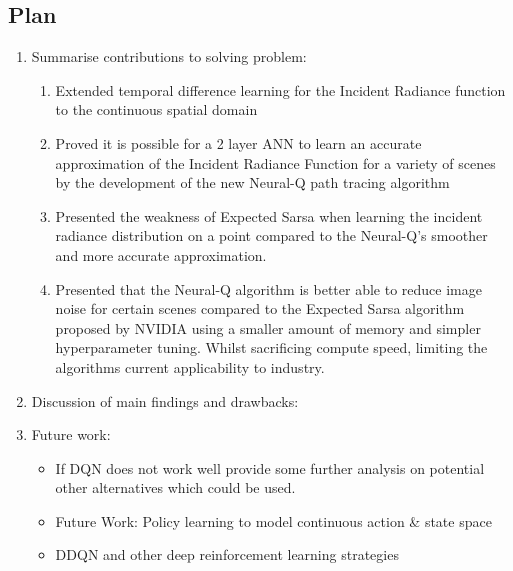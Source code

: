 \documentclass[../dissertation.tex]{subfiles}
\begin{document}
\subsection{Plan}
\begin{enumerate}

\item Summarise contributions to solving problem:
\begin{enumerate}
\item Extended temporal difference learning for the Incident Radiance function to the continuous spatial domain 

\item Proved it is possible for a 2 layer ANN to learn an accurate approximation of the Incident Radiance Function for a variety of scenes by the development of the new Neural-Q path tracing algorithm

\item Presented the weakness of Expected Sarsa when learning the incident radiance distribution on a point compared to the Neural-Q's smoother and more accurate approximation.

\item Presented that the Neural-Q algorithm is better able to reduce image noise for certain scenes compared to the Expected Sarsa algorithm proposed by NVIDIA using a smaller amount of memory and simpler hyperparameter tuning. Whilst sacrificing compute speed, limiting the algorithms current applicability to industry.
\end{enumerate}

\item Discussion of main findings and drawbacks:

\item Future work:

\begin{itemize}
\item If DQN does not work well provide some further analysis on potential other alternatives which could be used.

\item Future Work: Policy learning to model continuous action \& state space

\item DDQN and other deep reinforcement learning strategies
\end{itemize}
\end{enumerate}
\end{document}
